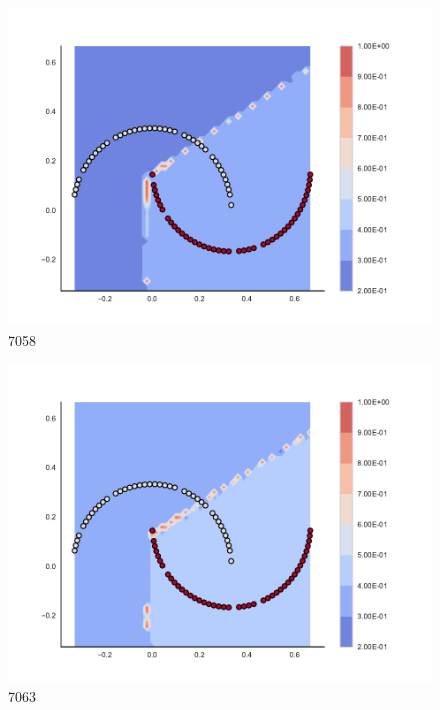 \begin{subfigure}[b]{0.09\textwidth}
    \includegraphics[clip, trim=2.35cm 1.75cm 4.5cm 0cm,width=\textwidth]{img/convergence/7058.pdf}
    \caption{7058}
    \label{fig:convergence_7058}
\end{subfigure}
%
\begin{subfigure}[b]{0.09\textwidth}
    \includegraphics[clip, trim=2.35cm 1.75cm 4.5cm 0cm,width=\textwidth]{img/convergence/7063.pdf}
    \caption{7063}
    \label{fig:convergence_7063}
\end{subfigure}
%
